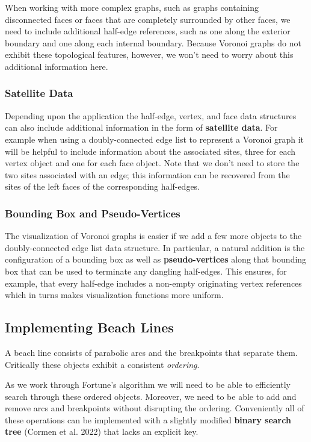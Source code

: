 \documentclass[
  letterpaper,
  DIV=11,
  numbers=noendperiod]{scrartcl}
\begin{document}
When working with more complex graphs, such as graphs containing
disconnected faces or faces that are completely surrounded by other
faces, we need to include additional half-edge references, such as one
along the exterior boundary and one along each internal boundary.
Because Voronoi graphs do not exhibit these topological features,
however, we won't need to worry about this additional information here.

\subsubsection{Satellite Data}\label{satellite-data}

Depending upon the application the half-edge, vertex, and face data
structures can also include additional information in the form of
\textbf{satellite data}. For example when using a doubly-connected edge
list to represent a Voronoi graph it will be helpful to include
information about the associated sites, three for each vertex object and
one for each face object. Note that we don't need to store the two sites
associated with an edge; this information can be recovered from the
sites of the left faces of the corresponding half-edges.

\subsubsection{Bounding Box and
Pseudo-Vertices}\label{bounding-box-and-pseudo-vertices}

The visualization of Voronoi graphs is easier if we add a few more
objects to the doubly-connected edge list data structure. In particular,
a natural addition is the configuration of a bounding box as well as
\textbf{pseudo-vertices} along that bounding box that can be used to
terminate any dangling half-edges. This ensures, for example, that every
half-edge includes a non-empty originating vertex references which in
turns makes visualization functions more uniform.

\subsection{Implementing Beach Lines}\label{implementing-beach-lines}

A beach line consists of parabolic arcs and the breakpoints that
separate them. Critically these objects exhibit a consistent
\emph{ordering}.

As we work through Fortune's algorithm we will need to be able to
efficiently search through these ordered objects. Moreover, we need to
be able to add and remove arcs and breakpoints without disrupting the
ordering. Conveniently all of these operations can be implemented with a
slightly modified \textbf{binary search tree} (Cormen et al. 2022) that
lacks an explicit key.
\end{document}
